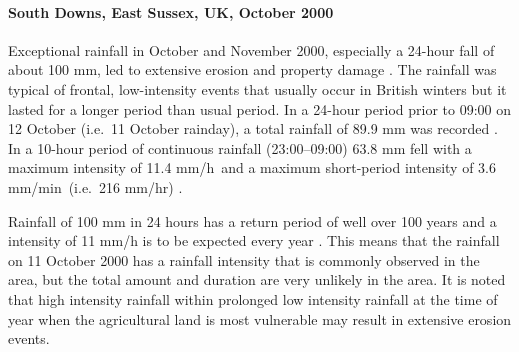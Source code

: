 \paragraph{South Downs, East Sussex, UK, October 2000
\citep{boardman2001-346}}
\label{sec:SouthDownsOctober2000}

Exceptional rainfall in October and November 2000, especially a 24-hour fall of
about 100 mm, led to extensive erosion and property damage
\citep{boardman2001-346}. The rainfall was typical of frontal, low-intensity
events that usually occur in British winters but it lasted for a longer period
than usual period. In a 24-hour period prior to 09:00 on 12 October (i.e.\ 11
October rainday), a total rainfall of 89.9 mm was recorded
\citep{boardman2001-346}.
In a 10-hour period of continuous rainfall (23:00--09:00) 63.8 mm fell with a
maximum intensity of 11.4 mm/h\ and a maximum short-period intensity of 3.6
mm/min\ (i.e.\ 216 mm/hr) \citep{boardman2001-346}.

Rainfall of 100 mm in 24 hours has a return period of well over 100 years and a
intensity of 11 mm/h is to be expected every year \citep{boardman2001-346}. This
means that the rainfall on 11 October 2000 has a rainfall intensity that is
commonly observed in the area, but the total amount and duration are very
unlikely in the area. It is noted that high intensity rainfall within prolonged
low intensity rainfall at the time of year when the agricultural land is most
vulnerable may result in extensive erosion events.




